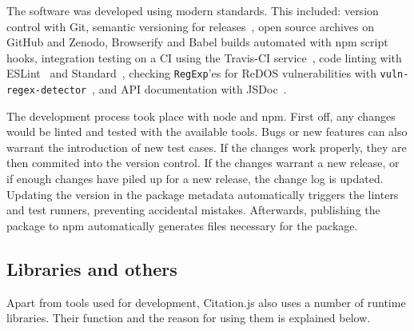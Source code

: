 \documentclass[fleqn,10pt,lineno]{wlpeerj} %
\begin{document}
The software was developed using modern standards. This included: version control with Git, semantic versioning for releases~\citep{preston-werner_semantic_2013}, open source archives on GitHub and Zenodo, Browserify \citep{noauthor_browserify:_2018} and Babel \citep{noauthor_babel:_2018} builds automated with npm script hooks, integration testing on a CI using the Travis-CI service~\citep{noauthor_travis_2018}, code linting with ESLint~\citep{noauthor_eslint:_2018} and Standard~\citep{noauthor_standard:_2018}, checking \texttt{RegExp}'es for ReDOS vulnerabilities with \texttt{vuln-regex-detector}~\citep{davis_impact_2018}, and API documentation with JSDoc~\citep{noauthor_jsdoc:_2018}.

The development process took place with node and npm. First off, any changes would be linted and tested with the available tools. Bugs or new features can also warrant the introduction of new test cases. If the changes work properly, they are then commited into the version control. If the changes warrant a new release, or if enough changes have piled up for a new release, the change log is updated. Updating the version in the package metadata automatically triggers the linters and test runners, preventing accidental mistakes. Afterwards, publishing the package to npm automatically generates files necessary for the package.

\subsection*{Libraries and others}

Apart from tools used for development, Citation.js also uses a number of runtime libraries. Their function and the reason for using them is explained below.
\end{document}
